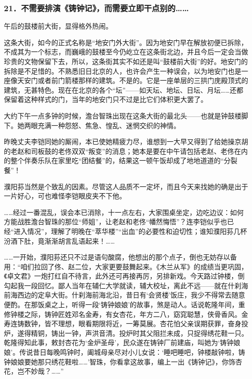 \subsubsection*{21．不需要排演《铸钟记》，而需要立即干点别的……}
\par 午后的鼓楼前大街，显得格外热闹。
\par 这条大街，如今的正式名称是“地安门外大街”。因为地安门早在解放初便已拆除，不成其为一个标志，而巍峨的鼓楼至今仍屹立在这条街北边，并且今后一定会当做珍贵的文物保留下去，所以，这条街其实不如还是叫“鼓楼前大街”的好。地安门的拆除是不足惜的。不熟悉旧日北京的人，也许会产生一种误会，以为地安门也是一座像天安门或者前门箭楼那样的建筑。不是的。它是一座单层的三拱门庑殿顶式的建筑，无甚特色。现在在北京的各个“坛”——如天坛、地坛、日坛、月坛……还都保留着这种样式的门，当年的地安门只不过是比它们体积更大罢了。
\par 大约下午一点多钟的时候，澹台智珠出现在这条大街的最北头——也就是钟鼓楼脚下。她两眼充满一种怨怒、焦急、惶乱、迷惘交织的神情。
\par 昨晚丈夫李铠同她的厮闹，本已使她精疲力尽，谁想到一大早又得到了给她操京胡的老赵和司板鼓的老佟双双“叛变”的消息；她本是要在中午请包括老赵、老佟在内的整个伴奏乐队在家里吃“团结餐”的，结果这一顿午饭却成了地地道道的“分裂餐”！
\par 濮阳荪当然是个致乱的因素。尽管这人品质不一定坏，而且今天来找她的确是出于一片好心，可也难怪李铠眼皮夹不下他。
\par ……经过一番混乱，误会本已消除，十一点左右，大家围桌坐定，边吃边议：如何方能战胜澹台智珠的那位“师姐”，让老赵和老佟“幡然悔悟”？连李铠似乎也已经“进入情况”，理解了明晚在“萃华楼”“出血”的必要性和迫切性；谁知濮阳荪几杯汾酒下肚，竟渐渐胡言乱语起来！……
\par ……一开始，濮阳荪还只不过是语句酸腐，他想出的那个点子，倒也无妨存以备用：“咱们拉回了佟、赵二位，大家更要鼓舞起来。《木兰从军》的成绩当更巩固，《卓文君》一炮打红自不待言，此外还可再接再厉，另排新戏。今天路过钟楼，倒勾起我一段回忆。鄙人当年在辅仁大学就读，辅大校址，离此不远——就在什刹海前海西边的定阜大街。什刹海前海北沿，昔日有‘会贤楼’饭庄，我少不得常去随意便酌。在那饭桌之上，听得一段‘铸钟娘娘’的故事，煞是动人。话说乾隆年间，重修钟楼之际，铸钟匠姓邓名金寿，有女杏花，年方二八，窈窕聪慧，侠骨香风。金寿连铸数钟，皆不理想，眼看期限将近，一筹莫展。杏花怕父亲误期获罪，奋身投炉，遂得精铜，铸出一钟，声洪音清。投炉时其父阻拦未成，只捉得绣花鞋一只。乾隆得知此事，敕封杏花为‘金炉圣母’，民众遂在铸钟厂前建庙，叫她为‘铸钟娘娘’。传说昔日每晚鸣钟时，阖城母亲尽对小儿女说：‘睡吧睡吧，钟楼敲钟啦，铸钟娘娘要她那只绣花鞋啦……’智珠，你看拿这故事，编上一出《铸钟记》，你饰杏花，岂不妙哉？……”
